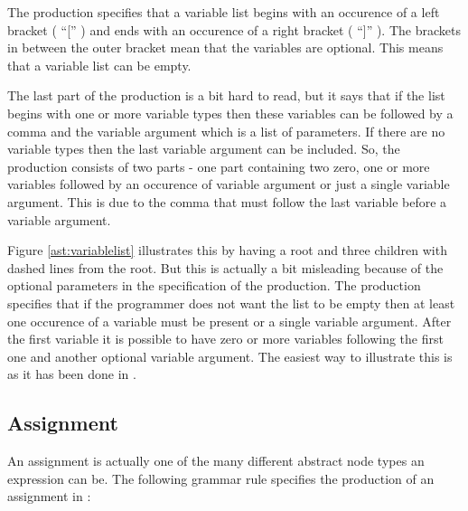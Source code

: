\begin{ebnf}%
%
\end{ebnf}%

The production specifies that a variable list begins with an occurence of a left bracket ( ``['' ) and ends with an occurence of a right bracket ( ``]'' ). The brackets in between the outer bracket mean that the variables are optional. This means that a variable list can be empty.%

The last part of the production is a bit hard to read, but it says that if the list begins with one or more variable types then these variables can be followed by a comma and the variable argument which is a list of parameters. If there are no variable types then the last variable argument can be included. So, the production consists of two parts - one part containing two zero, one or more variables followed by an occurence of variable argument or just a single variable argument. This is due to the comma that must follow the last variable before a variable argument.%

%

Figure \ref{ast:variablelist} illustrates this by having a root and three children with dashed lines from the root. But this is actually a bit misleading because of the optional parameters in the specification of the production. The production specifies that if the programmer does not want the list to be empty then at least one occurence of a variable must be present or a single variable argument. After the first variable it is possible to have zero or more variables following the first one and another optional variable argument. The easiest way to illustrate this is as it has been done in .%

\subsection{Assignment}%

An assignment is actually one of the many different abstract node types an expression can be. The following grammar rule specifies the production of an assignment in \productname{}:%

\begin{ebnf}%
%
\end{ebnf}%

